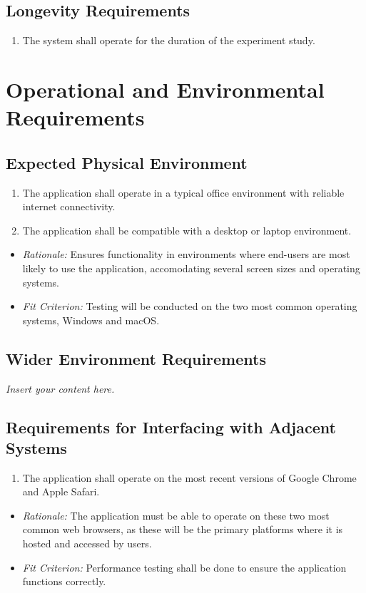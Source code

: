 \documentclass[12pt]{article}
\newcommand{\lips}{\textit{Insert your content here.}}
\begin{document}
\subsection{Longevity Requirements}
\begin{enumerate}
  \item The system shall operate for the duration of the experiment study.
\end{enumerate}

\section{Operational and Environmental Requirements}
\subsection{Expected Physical Environment}
\begin{enumerate}
  \item The application shall operate in a typical office environment with reliable internet connectivity.
  \item The application shall be compatible with a desktop or laptop environment.
\end{enumerate}
\begin{itemize}
  \item \textit{Rationale:} Ensures functionality in environments where end-users are most likely to use the application, accomodating several screen sizes and operating systems. 
  \item \textit{Fit Criterion:} Testing will be conducted on the two most common operating systems, Windows and macOS.
\end{itemize}

\subsection{Wider Environment Requirements}
\lips

\subsection{Requirements for Interfacing with Adjacent Systems}
\begin{enumerate}
  \item The application shall operate on the most recent versions of Google Chrome and Apple Safari.
\end{enumerate}
\begin{itemize}
  \item \textit{Rationale:} The application must be able to operate on these two most common web browsers, as these will be the primary platforms where it is hosted and accessed by users.
  \item \textit{Fit Criterion:} Performance testing shall be done to ensure the application functions correctly.
\end{itemize}
\end{document}
